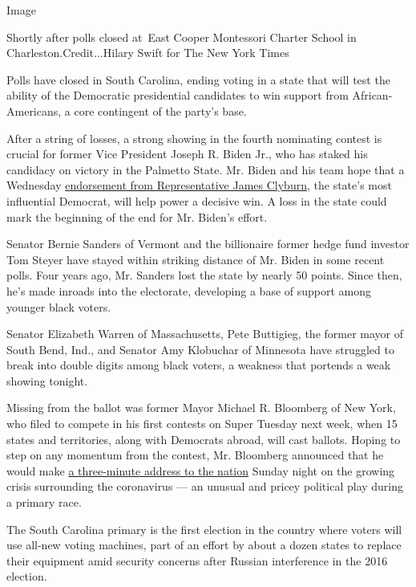 Image

Shortly after polls closed at~East Cooper Montessori Charter School in
Charleston.Credit...Hilary Swift for The New York Times

Polls have closed in South Carolina, ending voting in a state that will
test the ability of the Democratic presidential candidates to win
support from African-Americans, a core contingent of the party's base.

After a string of losses, a strong showing in the fourth nominating
contest is crucial for former Vice President Joseph R. Biden Jr., who
has staked his candidacy on victory in the Palmetto State. Mr. Biden and
his team hope that a Wednesday
\href{https://www.nytimes3xbfgragh.onion/live/2020/south-carolina-debate-primary-02-26}{endorsement
from Representative James Clyburn}, the state's most influential
Democrat, will help power a decisive win. A loss in the state could mark
the beginning of the end for Mr. Biden's effort.

Senator Bernie Sanders of Vermont and the billionaire former hedge fund
investor Tom Steyer have stayed within striking distance of Mr. Biden in
some recent polls. Four years ago, Mr. Sanders lost the state by nearly
50 points. Since then, he's made inroads into the electorate, developing
a base of support among younger black voters.

Senator Elizabeth Warren of Massachusetts, Pete Buttigieg, the former
mayor of South Bend, Ind., and Senator Amy Klobuchar of Minnesota have
struggled to break into double digits among black voters, a weakness
that portends a weak showing tonight.

Missing from the ballot was former Mayor Michael R. Bloomberg of New
York, who filed to compete in his first contests on Super Tuesday next
week, when 15 states and territories, along with Democrats abroad, will
cast ballots. Hoping to step on any momentum from the contest, Mr.
Bloomberg announced that he would make
\href{https://www.nytimes3xbfgragh.onion/2020/02/29/us/politics/michael-bloomberg-coronavirus-ad.html}{a
three-minute address to the nation} Sunday night on the growing crisis
surrounding the coronavirus --- an unusual and pricey political play
during a primary race.

The South Carolina primary is the first election in the country where
voters will use all-new voting machines, part of an effort by about a
dozen states to replace their equipment amid security concerns after
Russian interference in the 2016 election.

